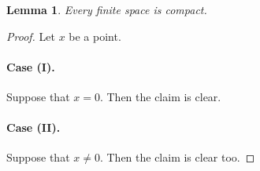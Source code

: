 \documentclass{article}
\newtheorem{lemma}{Lemma}
\begin{document}
\begin{lemma} Every finite space is compact. \end{lemma}
\begin{proof}
Let $x$ be a point.

\paragraph{Case (I). } Suppose that $x=0$. Then the claim is clear.

\paragraph{Case (II). } Suppose that $x\neq 0$. Then the claim is clear too.
\end{proof}
\end{document}
